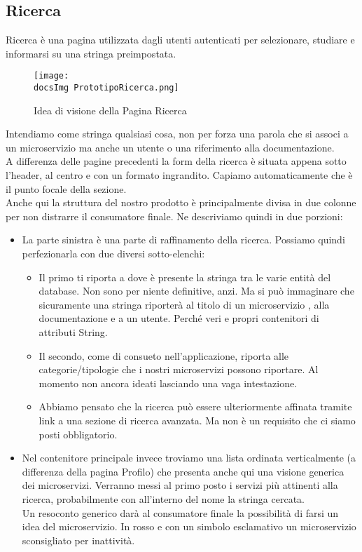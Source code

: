 {	\subsection{Ricerca}{
		Ricerca è una pagina utilizzata dagli utenti autenticati per selezionare, studiare e informarsi su una stringa preimpostata.\\
		\begin{figure}[ht]
			\centering
			\texttt{[image: \\docsImg PrototipoRicerca.png]}
			\caption{Idea di visione della Pagina Ricerca}
			\label{PrototipoRicerca}
		\end{figure}
		Intendiamo come stringa qualsiasi cosa, non per forza una parola che si associ a un microservizio ma anche un utente o una riferimento alla documentazione.\\
		A differenza delle pagine precedenti la form della ricerca è situata appena sotto l'header, al centro e con un formato ingrandito. Capiamo automaticamente che è il punto focale della sezione.\\
		Anche qui la struttura del nostro prodotto è principalmente divisa in due colonne per non distrarre il consumatore finale. Ne descriviamo quindi in due porzioni:
		\begin{itemize}
			\item La parte sinistra è una parte di raffinamento della ricerca. Possiamo quindi perfezionarla con due diversi sotto-elenchi:
			\begin{itemize}
				\item Il primo ti riporta a dove è presente la stringa tra le varie entità del database. Non sono per niente definitive, anzi. Ma si può immaginare che sicuramente una stringa riporterà al titolo di un microservizio , alla documentazione e a un utente. Perché veri e propri contenitori di attributi String.
				\item Il secondo, come di consueto nell'applicazione, riporta alle categorie/tipologie che i nostri microservizi possono riportare. Al momento non ancora ideati lasciando una vaga intestazione.
				\item Abbiamo pensato che la ricerca può essere ulteriormente affinata tramite link a una sezione di ricerca avanzata. Ma non è un requisito che ci siamo posti obbligatorio.
			\end{itemize} 
			\item Nel contenitore principale invece troviamo una lista ordinata verticalmente (a differenza della pagina Profilo) che presenta anche qui una visione generica dei microservizi. Verranno messi al primo posto i servizi più attinenti alla ricerca, probabilmente con all'interno del nome la stringa cercata.\\ 
			Un resoconto generico darà al consumatore finale la possibilità di farsi un idea del microservizio. In rosso e con un simbolo esclamativo un microservizio sconsigliato per inattività.  
		\end{itemize}	
	}		
}
